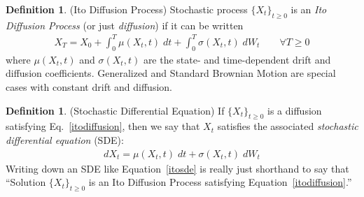 \documentclass[12pt]{article}
\theoremstyle{plain}
\theoremstyle{definition}
\newtheorem{defn}[thm]{Definition}
\theoremstyle{remark}
\begin{document}
\begin{defn}(Ito Diffusion Process)
Stochastic process $\{X_t\}_{t\geq 0}$ is an
\emph{Ito Diffusion Process} (or just \emph{diffusion})
if it can be written
\begin{align}
  X_T = X_0
  + \int_0^T \mu(X_t,t)\; dt
  + \int_0^T \sigma(X_t,t)\; dW_t
  \qquad\forall T\geq 0
  \label{itodiffusion}
\end{align}
where $\mu(X_t,t)$ and $\sigma(X_t,t)$ are the state- and time-dependent
drift and diffusion coefficients. Generalized and Standard Brownian
Motion are special cases with constant drift and diffusion.
\end{defn}

\begin{defn}(Stochastic Differential Equation)
If $\{X_t\}_{t\geq 0}$ is a diffusion satisfying
Eq.~\ref{itodiffusion}, then we say that $X_t$ satisfies the
associated \emph{stochastic differential equation} (SDE):
\begin{align}
  dX_t =
  \mu(X_t,t)\; dt
  + \sigma(X_t,t)\; dW_t
  \label{itosde}
\end{align}
Writing down an SDE like Equation~\ref{itosde} is really just shorthand
to say that ``Solution $\{X_t\}_{t\geq 0}$ is an Ito Diffusion Process
satisfying Equation~\ref{itodiffusion}.''
\end{defn}
\end{document}
